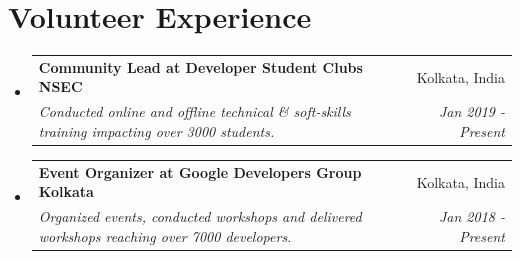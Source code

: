 \documentclass[a4paper,10pt]{article}
\makeatletter
\newcommand{\resumeItem}[2]{
  \item\small{
    \textbf{#1}{: #2 \vspace{-2pt}}
  }
}
\newcommand{\resumeSubheading}[4]{
  \vspace{-1pt}\item
    \begin{tabular*}{0.97\textwidth}{l@{\extracolsep{\fill}}r}
      \textbf{#1} & #2 \\
      \textit{#3} & \textit{#4} \\
    \end{tabular*}\vspace{-5pt}
}
\newcommand{\resumeSubItem}[2]{\resumeItem{#1}{#2}\vspace{-3pt}}
\newcommand{\resumeSubHeadingListStart}{\begin{itemize}[leftmargin=*]}
\newcommand{\resumeSubHeadingListEnd}{\end{itemize}}
\makeatother
\begin{document}
\section{Volunteer Experience}
  \resumeSubHeadingListStart
    \resumeSubheading
      {Community Lead at Developer Student Clubs NSEC}{Kolkata, India}
      {Conducted online and offline technical \& soft-skills training impacting over 3000 students.}{Jan 2019 - Present}
    \resumeSubheading
      {Event Organizer at Google Developers Group Kolkata}{Kolkata, India}
      {Organized events, conducted workshops and delivered workshops reaching over 7000 developers.}{Jan 2018 - Present}
  \resumeSubHeadingListEnd
\vspace{-5pt}


\end{document}
